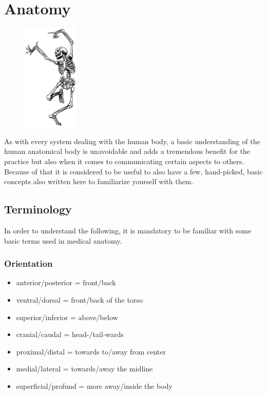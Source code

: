 \section{Anatomy}\label{sec:anatomy}

\begin{figure}
    \centering
    \includegraphics[width=0.25\textwidth]{images/anatomy}
\end{figure}

As with every system dealing with the human body, a basic understanding of the human anatomical body is unavoidable and adds a tremendous benefit for the practice but also when it comes to communicating certain aspects to others.
Because of that it is considered to be useful to also have a few, hand-picked, basic concepts also written here to familiarize yourself with them.

\subsection{Terminology}\label{subsec:terminology}

In order to understand the following, it is mandatory to be familiar with some basic terms used in medical anatomy.

\subsubsection{Orientation}

\begin{itemize}
    \setlength\itemsep{0em}
    \item anterior/posterior = front/back
    \item ventral/dorsal = front/back of the torso
    \item superior/inferior = above/below
    \item cranial/caudal = head-/tail-wards
    \item proximal/distal = towards to/away from center
    \item medial/lateral = towards/away the midline
    \item superficial/profund = more away/inside the body
\end{itemize}

